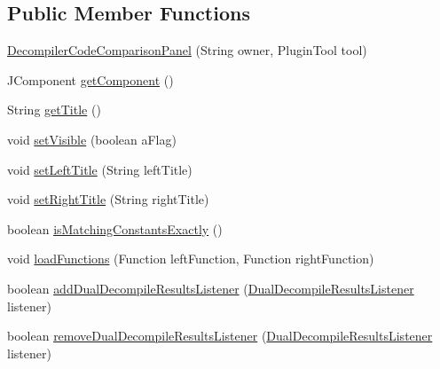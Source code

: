 \subsection*{Public Member Functions}
\begin{DoxyCompactItemize}
\item 
\mbox{\hyperlink{classghidra_1_1app_1_1decompiler_1_1component_1_1_decompiler_code_comparison_panel_aae6c0226bf57a6a1dd32722b11d8c973}{Decompiler\+Code\+Comparison\+Panel}} (String owner, Plugin\+Tool tool)
\item 
J\+Component \mbox{\hyperlink{classghidra_1_1app_1_1decompiler_1_1component_1_1_decompiler_code_comparison_panel_adebf8f8a54e2bbb92c093c0e9bd2fcc8}{get\+Component}} ()
\item 
String \mbox{\hyperlink{classghidra_1_1app_1_1decompiler_1_1component_1_1_decompiler_code_comparison_panel_a9dcab8653e6bf6aa85968f9b05c15336}{get\+Title}} ()
\item 
void \mbox{\hyperlink{classghidra_1_1app_1_1decompiler_1_1component_1_1_decompiler_code_comparison_panel_a5fc6f66580f6b919a68219492fe3ab97}{set\+Visible}} (boolean a\+Flag)
\item 
void \mbox{\hyperlink{classghidra_1_1app_1_1decompiler_1_1component_1_1_decompiler_code_comparison_panel_ac1eaddf2fa31e5b5e66e617aa37a82fb}{set\+Left\+Title}} (String left\+Title)
\item 
void \mbox{\hyperlink{classghidra_1_1app_1_1decompiler_1_1component_1_1_decompiler_code_comparison_panel_a31cc89b13763ab9ab3cb1917e096393d}{set\+Right\+Title}} (String right\+Title)
\item 
boolean \mbox{\hyperlink{classghidra_1_1app_1_1decompiler_1_1component_1_1_decompiler_code_comparison_panel_ab328dba06a2bffb6f14a7c994719ab6b}{is\+Matching\+Constants\+Exactly}} ()
\item 
void \mbox{\hyperlink{classghidra_1_1app_1_1decompiler_1_1component_1_1_decompiler_code_comparison_panel_ae9896a0f54a402d26175af3cff5ada29}{load\+Functions}} (Function left\+Function, Function right\+Function)
\item 
boolean \mbox{\hyperlink{classghidra_1_1app_1_1decompiler_1_1component_1_1_decompiler_code_comparison_panel_a70db6533642ac366041e559f7d056976}{add\+Dual\+Decompile\+Results\+Listener}} (\mbox{\hyperlink{interfaceghidra_1_1app_1_1decompiler_1_1component_1_1_dual_decompile_results_listener}{Dual\+Decompile\+Results\+Listener}} listener)
\item 
boolean \mbox{\hyperlink{classghidra_1_1app_1_1decompiler_1_1component_1_1_decompiler_code_comparison_panel_aa6115389c2f73fdf7cb95e3cd877195a}{remove\+Dual\+Decompile\+Results\+Listener}} (\mbox{\hyperlink{interfaceghidra_1_1app_1_1decompiler_1_1component_1_1_dual_decompile_results_listener}{Dual\+Decompile\+Results\+Listener}} listener)

\end{DoxyCompactItemize}
